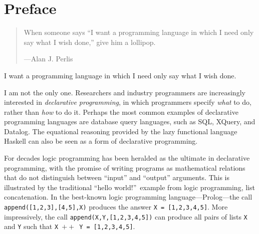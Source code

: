 \chapter{Preface}\label{sec:preface}





\vspace{-1cm}
\begin{quote}When someone says ``I want a programming language in which I need only say what I wish done,'' give him a lollipop. \\
\begin{flushright}
\vspace{-0.5cm}  
---Alan J. Perlis
\end{flushright}\end{quote}

\noindent
I want a programming language in which I need only say what I wish
done.

I am not the only one.   Researchers and industry programmers are
increasingly interested in \emph{declarative programming}, in which
programmers specify \emph{what} to do, rather than \emph{how} to do
it.  Perhaps the most common examples of declarative programming
languages are database query languages, such as SQL, XQuery, and
Datalog.  The equational reasoning provided by the lazy functional
language Haskell can also be seen as a form of declarative
programming.

For decades logic programming has been heralded as the ultimate in
declarative programming, with the promise of writing programs as
mathematical relations that do not distinguish between ``input'' and
``output'' arguments.  This is illustrated by the traditional ``hello
world!''~example from logic programming, list concatenation.  In the
best-known logic programming language---Prolog---the call \mbox{{\tt append([1,2,3],[4,5],X)}}
produces the answer \mbox{{\tt X = [1,2,3,4,5]}}.
More impressively, the call 
\mbox{{\tt append(X,Y,[1,2,3,4,5])}} can produce all pairs of lists
{\tt X} and {\tt Y} such that \mbox{{\tt X} $++$ {\tt Y = [1,2,3,4,5]}}.

